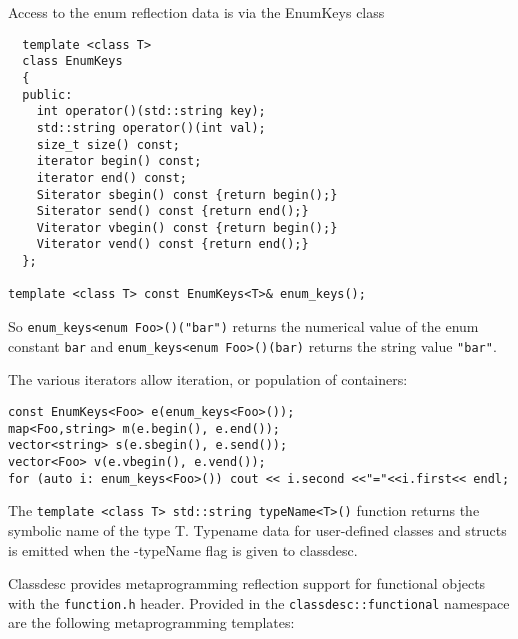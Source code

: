 Access to the enum reflection data is via the EnumKeys class
\begin{verbatim}
  template <class T>
  class EnumKeys
  {
  public:
    int operator()(std::string key);
    std::string operator()(int val);
    size_t size() const;
    iterator begin() const;
    iterator end() const;
    Siterator sbegin() const {return begin();}
    Siterator send() const {return end();}
    Viterator vbegin() const {return begin();}
    Viterator vend() const {return end();}
  };

template <class T> const EnumKeys<T>& enum_keys();
\end{verbatim}
So \verb+enum_keys<enum Foo>()("bar")+ returns the numerical value of
the enum constant \verb+bar+ and \verb+enum_keys<enum Foo>()(bar)+
returns the string value \verb+"bar"+.

The various iterators allow iteration, or population of containers:
\begin{verbatim}
const EnumKeys<Foo> e(enum_keys<Foo>());
map<Foo,string> m(e.begin(), e.end());
vector<string> s(e.sbegin(), e.send());
vector<Foo> v(e.vbegin(), e.vend());
for (auto i: enum_keys<Foo>()) cout << i.second <<"="<<i.first<< endl;
\end{verbatim}



The \verb+template <class T> std::string typeName<T>()+ function
 returns the symbolic name of the type T. Typename data for
user-defined classes and structs is emitted when the -typeName flag is
given to classdesc.


Classdesc provides metaprogramming reflection support for functional
objects with the \verb+function.h+ header. Provided in the
\verb+classdesc::functional+ namespace are the following
metaprogramming templates:

